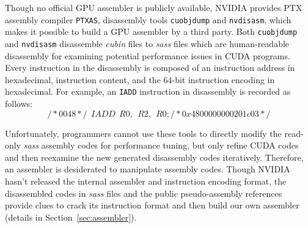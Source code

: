 Though no official GPU assembler is publicly available, 
NVIDIA provides PTX assembly compiler {\tt PTXAS}, disassembly tools {\tt cuobjdump} and {\tt nvdisasm}, which makes it possible to build a GPU assembler by a third party.
Both {\tt cuobjdump} and {\tt nvdisasm} disassemble {\em cubin} files to {\em sass} files which are human-readable disassembly for examining potential performance issues in CUDA programs. 
Every instruction in the disassembly is composed of an instruction address
in hexadecimal, instruction content, and the 64-bit instruction encoding in hexadecimal. 
For example, an {\tt IADD} instruction in disassembly is recorded as follows:
{\footnotesize
\begin{equation}
\label{eq:iadd}
    /*0048*/~~IADD~~R0,~~R2,~~R0;/*0x4800000000201c03*/
\end{equation}
}

Unfortunately, programmers cannot use these tools to directly modify the read-only {\em sass} assembly codes for performance tuning, but only refine CUDA codes and then reexamine the new generated disassembly codes iteratively.
Therefore, an assembler is desiderated to manipulate assembly codes. 
Though NVIDIA hasn't released the internal assembler and instruction encoding format, the disassembled codes in {\em sass} files and the public pseudo-assembly references~\cite{ptx2015isa} provide clues to crack its instruction format and then build our own assembler (details in Section~\ref{sec:assembler}).

